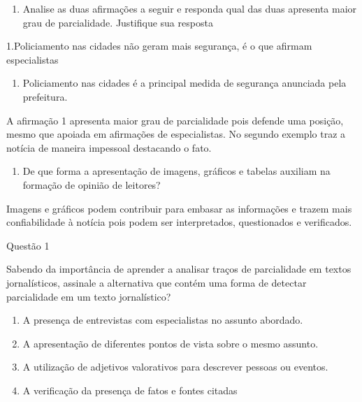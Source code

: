 {\begin{enumerate}
\def\labelenumi{\arabic{enumi})}
\setcounter{enumi}{8}
\tightlist
\item
  Analise as duas afirmações a seguir e responda qual das duas apresenta
  maior grau de parcialidade. Justifique sua resposta
\end{enumerate}

1.Policiamento nas cidades não geram mais segurança, é o que afirmam
especialistas

\begin{enumerate}
\def\labelenumi{\arabic{enumi}.}
\tightlist
\item
  Policiamento nas cidades é a principal medida de segurança anunciada
  pela prefeitura.
\end{enumerate}

A afirmação 1 apresenta maior grau de parcialidade pois defende uma
posição, mesmo que apoiada em afirmações de especialistas. No segundo
exemplo traz a notícia de maneira impessoal destacando o fato.

\begin{enumerate}
\def\labelenumi{\arabic{enumi})}
\setcounter{enumi}{9}
\tightlist
\item
  De que forma a apresentação de imagens, gráficos e tabelas auxiliam na
  formação de opinião de leitores?
\end{enumerate}

Imagens e gráficos podem contribuir para embasar as informações e trazem
mais confiabilidade à notícia pois podem ser interpretados, questionados
e verificados.


Questão 1

Sabendo da importância de aprender a analisar traços de parcialidade em
textos jornalísticos, assinale a alternativa que contém uma forma de
detectar parcialidade em um texto jornalístico?

\begin{enumerate}
\def\labelenumi{\alph{enumi})}
\item
  A presença de entrevistas com especialistas no assunto abordado.
\item
  A apresentação de diferentes pontos de vista sobre o mesmo assunto.
\item
  A utilização de adjetivos valorativos para descrever pessoas ou
  eventos.
\item
  A verificação da presença de fatos e fontes citadas
\end{enumerate}

}

